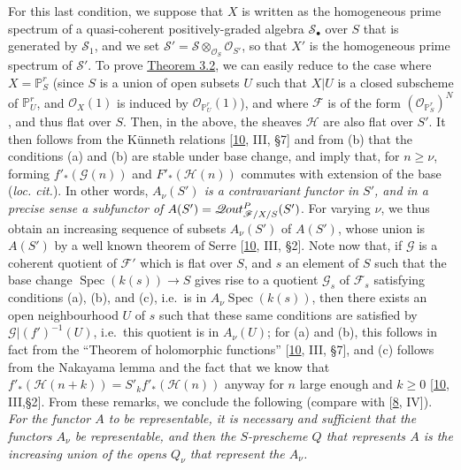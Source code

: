 \documentclass{article}
\newcommand{\oldpage}[1]{\marginpar{\footnotesize$\Big\vert$ \textit{p.~#1}}}
\theoremstyle{definition}
\theoremstyle{definition}
\theoremstyle{definition}
\theoremstyle{definition}
\theoremstyle{remark}
\begin{document}
For this last condition, we suppose that \(X\) is written as the homogeneous prime spectrum of a quasi-coherent positively-graded algebra \({\mathcal{S}}_\bullet\) over \(S\) that is generated by \({\mathcal{S}}_1\), and we set \({\mathcal{S}}'={\mathcal{S}}\otimes_{{\mathscr{O}}_S}{\mathscr{O}}_{S'}\), so that \(X'\) is the homogeneous prime spectrum of \({\mathcal{S}}'\).
To prove \protect\hyperlink{fga-3-iv-theorem-3.2}{Theorem 3.2}, we can easily reduce to the case where \(X=\mathbb{P}_S^r\) (since \(S\) is a union of open subsets \(U\) such that \(X|U\) is a closed subscheme of \(\mathbb{P}_U^r\), and \({\mathscr{O}}_X(1)\) is induced by \({\mathscr{O}}_{\mathbb{P}_U^r}(1)\)), and where \({\mathscr{F}}\) is of the form \(({\mathscr{O}}_{\mathbb{P}_S^r})^N\), and thus flat over \(S\).
Then, in the above, the sheaves \({\mathscr{H}}\) are also flat over \(S'\).
It then follows from the Künneth relations {[}\protect\hyperlink{ref-GD1960}{10}, III, §7{]} and from (b) that the conditions (a) and (b) are stable under base change, and imply that, for \(n\geqslant\nu\), forming \(f'_*({\mathscr{G}}(n))\) and \(F'_*({\mathscr{H}}(n))\) commutes with extension of the base (\emph{loc. cit.}).
In other words, \emph{\(A_\nu(S')\) is a contravariant functor in \(S'\), and in a precise sense a subfunctor of \(A(S')=\mathscr{Q}\kern -.5pt out_{{{\mathscr{F}}/X/S}}^P(S')\)}.
For varying \(\nu\), we thus obtain an increasing sequence of subsets \(A_\nu(S')\) of \(A(S')\), whose union is \(A(S')\) by a well known theorem of Serre {[}\protect\hyperlink{ref-GD1960}{10}, III, §2{]}.
Note now that, if \({\mathscr{G}}\) is a coherent quotient of \({\mathscr{F}}'\) which is flat over \(S\), and \(s\) an element of \(S\) such that the base change \(\operatorname{Spec}(k(s))\to S\) gives rise to a quotient \({\mathscr{G}}_s\) of \({\mathscr{F}}_s\) satisfying conditions (a), (b), and (c), i.e.~is in \(A_\nu\operatorname{Spec}(k(s))\), then there exists an open neighbourhood \(U\) of \(s\) such that these same conditions are satisfied by \({\mathscr{G}}|(f')^{-1}(U)\), i.e.~this quotient is in \(A_\nu(U)\);
for (a) and (b), this follows in fact from the ``Theorem of holomorphic functions'' {[}\protect\hyperlink{ref-GD1960}{10}, III, §7{]}, and (c) follows from the Nakayama lemma and the fact that we know that \(f'_*({\mathscr{H}}(n+k))=S'_kf'_*({\mathscr{H}}(n))\) anyway for \(n\) large enough and \(k\geqslant 0\) {[}\protect\hyperlink{ref-GD1960}{10}, III,§2{]}.
\oldpage{221-13}From these remarks, we conclude the following (compare with {[}\protect\hyperlink{ref-Gro1960a}{8}, IV{]}).
\emph{For the functor \(A\) to be representable, it is necessary and sufficient that the functors \(A_\nu\) be representable, and then the \(S\)-prescheme \(Q\) that represents \(A\) is the increasing union of the opens \(Q_\nu\) that represent the \(A_\nu\).}
\end{document}
